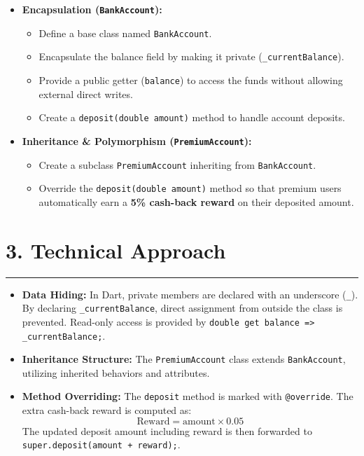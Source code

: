 \documentclass[11pt,a4paper]{article}
\begin{document}
\begin{itemize}
    \setlength{\itemsep}{8pt}
    \item \textbf{Encapsulation (\texttt{BankAccount}):}
    \begin{itemize}
        \item Define a base class named \texttt{BankAccount}.
        \item Encapsulate the balance field by making it private (\texttt{\_currentBalance}).
        \item Provide a public getter (\texttt{balance}) to access the funds without allowing external direct writes.
        \item Create a \texttt{deposit(double amount)} method to handle account deposits.
    \end{itemize}
    \item \textbf{Inheritance \& Polymorphism (\texttt{PremiumAccount}):}
    \begin{itemize}
        \item Create a subclass \texttt{PremiumAccount} inheriting from \texttt{BankAccount}.
        \item Override the \texttt{deposit(double amount)} method so that premium users automatically earn a \textbf{5\% cash-back reward} on their deposited amount.
    \end{itemize}
\end{itemize}

\vspace{0.35cm}
\section*{3. Technical Approach}
\noindent\rule{\textwidth}{0.5pt}\vspace{0.15cm}

\begin{itemize}
    \setlength{\itemsep}{4pt}
    \item \textbf{Data Hiding:} In Dart, private members are declared with an underscore (\texttt{\_}). By declaring \texttt{\_currentBalance}, direct assignment from outside the class is prevented. Read-only access is provided by \texttt{double get balance => \_currentBalance;}.
    \item \textbf{Inheritance Structure:} The \texttt{PremiumAccount} class extends \texttt{BankAccount}, utilizing inherited behaviors and attributes.
    \item \textbf{Method Overriding:} The \texttt{deposit} method is marked with \texttt{@override}. The extra cash-back reward is computed as:
    \[
        \text{Reward} = \text{amount} \times 0.05
    \]
    The updated deposit amount including reward is then forwarded to \texttt{super.deposit(amount + reward);}.
\end{itemize}
\end{document}
